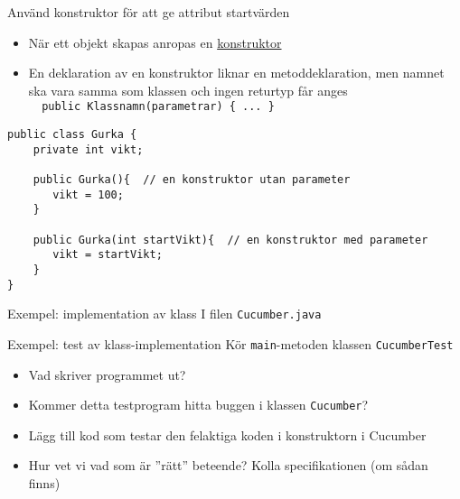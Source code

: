 \documentclass{lecturenotes}
\begin{document}
\begin{Slide}{Använd konstruktor för att ge attribut startvärden}
\begin{itemize}
\item När ett objekt skapas anropas en \href{https://docs.oracle.com/javase/tutorial/java/javaOO/constructors.html}{konstruktor}
\item En deklaration av en konstruktor liknar en metoddeklaration, men namnet ska vara samma som klassen och ingen  returtyp får anges \\ \lstinline+  public Klassnamn(parametrar) { ... } +
\end{itemize}
\begin{lstlisting}[]
public class Gurka {
    private int vikt;  

    public Gurka(){  // en konstruktor utan parameter
       vikt = 100;
    } 
    
    public Gurka(int startVikt){  // en konstruktor med parameter
       vikt = startVikt;
    } 
}
\end{lstlisting}
\end{Slide}

\begin{Slide}{Exempel: implementation av klass}
\scriptsize I filen \texttt{Cucumber.java}

\end{Slide}

\begin{Slide}{Exempel: test av klass-implementation}
\scriptsize Kör \texttt{main}-metoden klassen \texttt{CucumberTest} 

\begin{itemize}
\item Vad skriver programmet ut?
\item Kommer detta testprogram hitta buggen i klassen \texttt{Cucumber}?
\item Lägg till kod som testar den felaktiga koden i konstruktorn i Cucumber
\item Hur vet vi vad som är ''rätt'' beteende? \pause Kolla specifikationen (om sådan finns)
\end{itemize}
\end{Slide}
\end{document}
